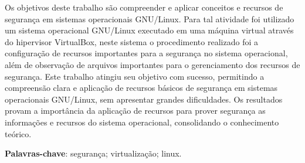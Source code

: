 \documentclass[
  12pt,				%
  oneside,   	        %
  a4paper,			%
  english,			%
  french,				%
  spanish,			%
  brazil,				%
  ]{pacotes/abntex2}
\begin{document}
\frenchspacing 



\imprimirfolhaderosto



\begin{resumo}
Os objetivos deste trabalho são compreender e aplicar conceitos e recursos de segurança em sistemas operacionais GNU/Linux. Para tal atividade foi utilizado um sistema operacional GNU/Linux executado em uma máquina virtual através do hipervisor VirtualBox, neste sistema o procedimento realizado foi a configuração de recursos importantes para a segurança no sistema operacional, além de observação de arquivos importantes para o gerenciamento dos recursos de segurança. Este trabalho atingiu seu objetivo com sucesso, permitindo a compreensão clara e aplicação de recursos básicos de segurança em sistemas operacionais GNU/Linux, sem apresentar grandes dificuldades. Os resultados provam a importância da aplicação de recursos para prover segurança as informações e recursos do sistema operacional, consolidando o conhecimento teórico.

  \vspace{\onelineskip}
    
  \noindent
  \textbf{Palavras-chave}: segurança; virtualização; linux.
\end{resumo}



\end{document}
